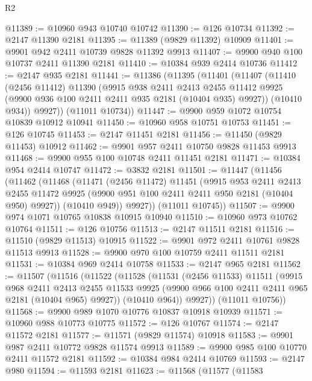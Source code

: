 \begin{lexlean}{R2}
\begin{coremodule}
@11389 := @10960 @943 @10740 @10742
@11390 := @126 @10734
@11392 := @2147 @11390 @2181
@11395 := @11389 (@9829 @11392) @10909
@11401 := @9901 @942 @2411 @10739 @9828 @11392 @9913
@11407 := @9900 @940 @100 @10737 @2411 @11390 @2181
@11410 := @10384 @939 @2414 @10736
@11412 := @2147 @935 @2181
@11441 := @11386
    (@11395
      (@11401
        (@11407
          (@11410
            (@2456 @11412)
            @11390
            (@9915
              @938
              @2411
              @2413
              @2455
              @11412
              @9925
              (@9900 @936 @100 @2411 @2411 @935 @2181 (@10404 @935) @9927))
            (@10410 @934))
          @9927))
      (@11011 @10734))
@11447 := @9900 @959 @1072 @10754 @10839 @10912 @10941
@11450 := @10960 @958 @10751 @10753
@11451 := @126 @10745
@11453 := @2147 @11451 @2181
@11456 := @11450 (@9829 @11453) @10912
@11462 := @9901 @957 @2411 @10750 @9828 @11453 @9913
@11468 := @9900 @955 @100 @10748 @2411 @11451 @2181
@11471 := @10384 @954 @2414 @10747
@11472 := @3832 @2181
@11501 := @11447
    (@11456
      (@11462
        (@11468
          (@11471
            (@2456 @11472)
            @11451
            (@9915
              @953
              @2411
              @2413
              @2455
              @11472
              @9925
              (@9900 @951 @100 @2411 @2411 @950 @2181 (@10404 @950) @9927))
            (@10410 @949))
          @9927))
      (@11011 @10745))
@11507 := @9900 @974 @1071 @10765 @10838 @10915 @10940
@11510 := @10960 @973 @10762 @10764
@11511 := @126 @10756
@11513 := @2147 @11511 @2181
@11516 := @11510 (@9829 @11513) @10915
@11522 := @9901 @972 @2411 @10761 @9828 @11513 @9913
@11528 := @9900 @970 @100 @10759 @2411 @11511 @2181
@11531 := @10384 @969 @2414 @10758
@11533 := @2147 @965 @2181
@11562 := @11507
    (@11516
      (@11522
        (@11528
          (@11531
            (@2456 @11533)
            @11511
            (@9915
              @968
              @2411
              @2413
              @2455
              @11533
              @9925
              (@9900 @966 @100 @2411 @2411 @965 @2181 (@10404 @965) @9927))
            (@10410 @964))
          @9927))
      (@11011 @10756))
@11568 := @9900 @989 @1070 @10776 @10837 @10918 @10939
@11571 := @10960 @988 @10773 @10775
@11572 := @126 @10767
@11574 := @2147 @11572 @2181
@11577 := @11571 (@9829 @11574) @10918
@11583 := @9901 @987 @2411 @10772 @9828 @11574 @9913
@11589 := @9900 @985 @100 @10770 @2411 @11572 @2181
@11592 := @10384 @984 @2414 @10769
@11593 := @2147 @980
@11594 := @11593 @2181
@11623 := @11568
    (@11577
      (@11583

\end{coremodule}
\end{lexlean}
